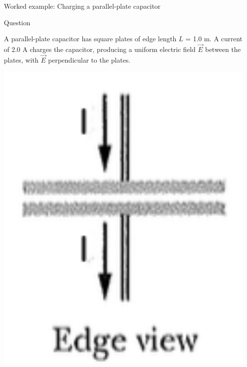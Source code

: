 {
\problemslide

%
%
%

\begin{frame}{Worked example: Charging a parallel-plate capacitor}

  \begin{blockexmplque}{Question}

    A parallel-plate capacitor has square plates of edge length $L$ = 1.0 m.
    A current of 2.0 A charges the capacitor, producing a uniform electric
    field $\vec{E}$ between the plates, with $\vec{E}$ perpendicular to the plates.\\
    \vspace{0.2cm}
    \begin{minipage}[l]{0.19\textwidth}
     \begin{center}
    	 \includegraphics[width=0.98\textwidth]{./images/problems/lect08_parallel_plate_capacitor_edge_view}\\
     \end{center}
    \end{minipage}
    \begin{minipage}[l]{0.19\textwidth}

\end{minipage}
\end{blockexmplque}
\end{frame}}
